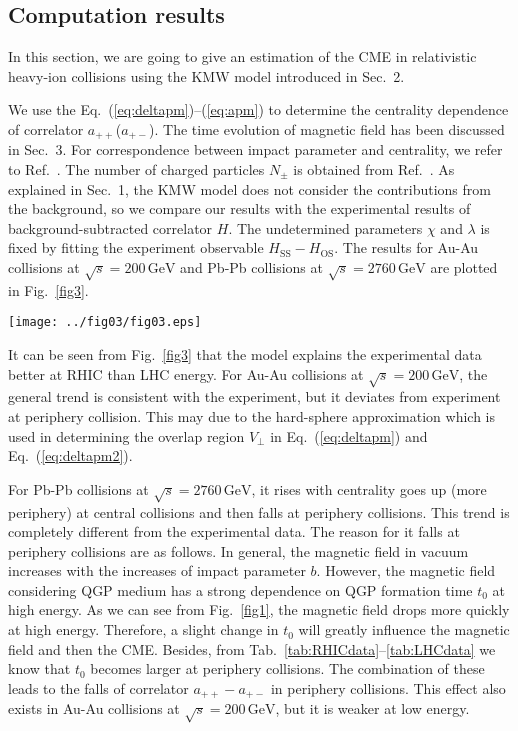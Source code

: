 \documentclass[a4paper,10pt,twoside]{cpc-hepnp}
\begin{document}
\begin{CJK*}{GBK}{song}
\begin{multicols}{2}
\section{Computation results}\label{compuResult}
In this section, we are going to give an estimation of the CME in relativistic heavy-ion collisions using the KMW model introduced in Sec.~2.

We use the Eq.~(\ref{eq:deltapm})--(\ref{eq:apm}) to determine the centrality dependence of correlator $a_{++}$($a_{+-}$). The time evolution of magnetic field has been discussed in Sec.~3. For correspondence between impact parameter and centrality, we refer to Ref.~\cite{Ray:2007av,Abelev:2013qoq}. The number of charged particles $N_\pm$ is obtained from Ref.~\cite{Ray:2007av,Aamodt:2011cdo}. As explained in Sec.~1, the KMW model does not consider the contributions from the background, so we compare our results with the experimental results of background-subtracted correlator $H$. The undetermined parameters $\chi$ and $\lambda$ is fixed by fitting the experiment observable $H_\text{SS} - H_\text{OS}$. The results for Au-Au collisions at $\sqrt{s} = 200\,\mathrm{GeV}$ and Pb-Pb collisions at $\sqrt{s} = 2760\,\mathrm{GeV}$ are plotted in Fig.~\ref{fig3}.

\begin{center}
\texttt{[image: ../fig03/fig03.eps]}
\end{center}

It can be seen from Fig.~\ref{fig3} that the model explains the experimental data better at RHIC than LHC energy. For Au-Au collisions at $\sqrt{s} = 200\,\mathrm{GeV}$, the general trend is consistent with the experiment, but it deviates from experiment at periphery collision. This may due to the hard-sphere approximation which is used in determining the overlap region $V_\perp$ in Eq.~(\ref{eq:deltapm}) and Eq.~(\ref{eq:deltapm2}).

For Pb-Pb collisions at $\sqrt{s} = 2760\,\mathrm{GeV}$, it rises with centrality goes up (more periphery) at central collisions and then falls at periphery collisions. This trend is completely different from the experimental data. The reason for it falls at periphery collisions are as follows. In general, the magnetic field in vacuum increases with the increases of impact parameter $b$. However, the magnetic field considering QGP medium has a strong dependence on QGP formation time $t_0$ at high energy. As we can see from Fig.~\ref{fig1}, the magnetic field drops more quickly at high energy. Therefore, a slight change in $t_0$ will greatly influence the magnetic field and then the CME. Besides, from Tab.~\ref{tab:RHICdata}--\ref{tab:LHCdata} we know that $t_0$ becomes larger at periphery collisions. The combination of these leads to the falls of correlator $a_{++} - a_{+-}$ in periphery collisions. This effect also exists in Au-Au collisions at $\sqrt{s} = 200\,\mathrm{GeV}$, but it is weaker at low energy.


\end{multicols}
\end{CJK*}
\end{document}
